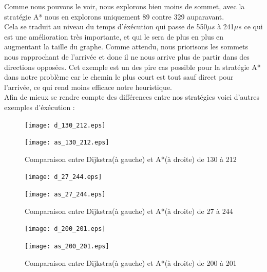 \documentclass{article}
\begin{document}
Comme nous pouvons le voir, nous explorons bien moins de sommet, avec la stratégie A* nous en
explorons uniquement 89 contre 329 auparavant.\\
Cela se traduit au niveau du temps d'éxécution qui passe de 550$\mu s$ à 241$\mu s$ ce qui est
une amélioration très importante, et qui le sera de plus en plus en augmentant la taille du
graphe.
Comme attendu, nous priorisons les sommets nous rapprochant de l'arrivée et donc il ne nous arrive
plus de partir dans des directions opposées. Cet exemple est un des pire cas possible pour 
la stratégie A* dans notre problème car le chemin le plus court est tout sauf direct pour
l'arrivée, ce qui rend moins efficace notre heuristique.\\

Afin de mieux se rendre compte des différences entre nos stratégies voici d'autres exemples
d'éxécution :\\

\clearpage

\begin{figure}[!hbt]
		\begin{minipage}{0.45\textwidth}
			\centering
			\texttt{[image: d\_130\_212.eps]}
		\end{minipage}
		\begin{minipage}{0.45\textwidth}
			\centering
			\texttt{[image: as\_130\_212.eps]}
		\end{minipage}
		\caption{Comparaison entre Dijkstra(à gauche) et A*(à droite) de 130 à 212}
		\label{vs_1}
\end{figure}


\begin{figure}[!hbt]
		\begin{minipage}{0.45\textwidth}
			\centering
			\texttt{[image: d\_27\_244.eps]}
		\end{minipage}
		\begin{minipage}{0.45\textwidth}
			\centering
			\texttt{[image: as\_27\_244.eps]}
		\end{minipage}
		\caption{Comparaison entre Dijkstra(à gauche) et A*(à droite) de 27 à 244}
		\label{vs_2}
\end{figure}


\begin{figure}[!hbt]
		\begin{minipage}{0.45\textwidth}
			\centering
			\texttt{[image: d\_200\_201.eps]}
		\end{minipage}
		\begin{minipage}{0.45\textwidth}
			\centering
			\texttt{[image: as\_200\_201.eps]}
		\end{minipage}
		\caption{Comparaison entre Dijkstra(à gauche) et A*(à droite) de 200 à 201}
		\label{vs_3}
\end{figure}
\end{document}
